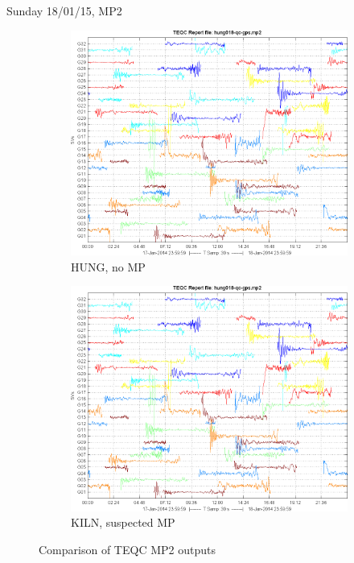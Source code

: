 \documentclass[9pt]{beamer}
\begin{document}
{\begin{frame}{Sunday 18/01/15, MP2}
	\begin{figure}
		\centering
		\begin{subfigure}{.5\textwidth}
			\centering
			\includegraphics[width=\textwidth]{pic/hung018_qc_gps_mp2.png}
			\caption{HUNG, no MP}
			\label{fig:sub1}
		\end{subfigure}%
		\begin{subfigure}{.5\textwidth}
			\centering
			\includegraphics[width=\textwidth]{pic/hung018_qc_gps_mp2.png}
			\caption{KILN, suspected MP}
			\label{fig:sub2}
		\end{subfigure}
		\caption{Comparison of TEQC MP2 outputs}
	\end{figure}
\end{frame}	

}
\end{document}
